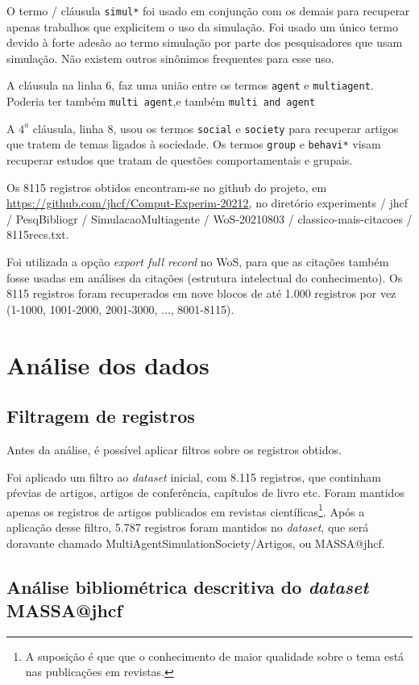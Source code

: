 O termo / cláusula  \texttt{simul*} foi usado em conjunção com os demais para recuperar apenas trabalhos que explicitem o uso da simulação.
Foi usado um único termo devido à forte adesão ao termo simulação por parte dos pesquisadores que usam simulação. Não existem outros sinônimos frequentes para esse uso.

A cláusula na linha 6, faz uma união entre os termos \texttt{agent} e \texttt{multiagent}.
Poderia ter também \texttt{multi agent},e  também \texttt{multi and agent}

A $4^{a}$ cláusula, linha 8,  usou os termos \texttt{social} e \texttt{society} para recuperar artigos que tratem de temas ligados à sociedade.
Os termos \texttt{group} e \texttt{behavi*} visam recuperar estudos que tratam de questões comportamentais e grupais.

Os 8115 registros obtidos encontram-se no github do projeto, em \url{https://github.com/jhcf/Comput-Experim-20212}, no diretório { experiments / jhcf / PesqBibliogr / SimulacaoMultiagente / WoS-20210803 / classico-mais-citacoes / 8115recs.txt}. 

Foi utilizada a opção \textit{export full record} no WoS, para que as citações também fosse usadas em análises da citações (estrutura intelectual do conhecimento). Os 8115 registros foram recuperados em nove blocos de até 1.000 registros por vez (1-1000, 1001-2000, 2001-3000, ..., 8001-8115).

\section{Análise dos dados}

\subsection{Filtragem de registros}
Antes da análise, é possível aplicar filtros sobre os registros obtidos.

Foi aplicado um filtro ao \textit{dataset} inicial, com 8.115 registros, que continham pŕevias de artigos, artigos de conferência, capítulos de livro etc. Foram mantidos apenas os registros de artigos publicados em revistas científicas\footnote{A suposição é que que o conhecimento de maior qualidade sobre o tema está nas publicações em revistas.}. Após a aplicação desse filtro, 5.787 registros foram mantidos no \textit{dataset}, que será doravante chamado MultiAgentSimulationSociety/Artigos, ou MASSA@jhcf.

\subsection{Análise bibliométrica descritiva do \textit{dataset} MASSA@jhcf}

